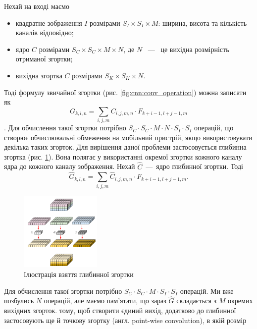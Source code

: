 Нехай на вході маємо
\begin{itemize}
    \item квадратне зображення $I$ розмірами $S_I \times S_I \times M$: ширина, висота та
          кількість каналів відповідно;
    \item ядро $C$ розмірами $S_C \times S_C \times M \times N$, де $N$ ~---~ це вихідна розмірність
          отриманої згортки;
    \item вихідна згортка $C$ розмірами $S_K \times S_K \times N$.
\end{itemize}
Тоді формулу звичайної згортки (рис. \ref{fig:cnn:conv_operation}) можна записати як
\begin{equation*}
    G_{k,l,n} = \sum_{i,j,m} C_{i,j,m,n} \cdot  F_{k+i-1, l+j-1,m}
\end{equation*}.
Для обчислення такої згортки потрібно $S_C \cdot  S_C \cdot  M \cdot  N \cdot  S_I \cdot  S_I$ операцій, що
створює обчислювальні обмеження на мобільний пристрій, якщо використовувати
декілька таких згорток.
Для вирішення даної проблеми застосовується глибинна згортка (рис. \ref{fig:cnn:deep_wise_conv}).
Вона полягає у використанні окремої згортки кожного каналу ядра до кожного каналу
зображення.
Нехай $\widehat{C}$~---~ядро глибинної згортки. Тоді
\begin{equation}
    \widehat{G}_{k,l,n} = \sum_{i,j,m} \widehat{C}_{i,j,m,n} \cdot  F_{k+i-1, l+j-1,m}.
\end{equation}
\begin{figure}[H]
    \centering
    \includegraphics[width=0.35\textwidth]{images/cnn_deep_wise_conv}
    \caption{Ілюстрація взяття глибинної згортки  \cite{deep_wise_sep_conv_website}
        \label{fig:cnn:deep_wise_conv}
    }
\end{figure}
Для обчислення такої згортки потрібно  $S_C \cdot  S_C \cdot  M \cdot  S_I \cdot  S_I$ операцій. Ми вже
позбулись $N$ операцій, але маємо пам'ятати, що
зараз $\widehat{G}$ складається з $M$ окремих вихідних згорток.
тому, щоб створити єдиний вихід, додатково до глибинної застосовують ще
й точкову згортку (англ. point-wise convolution), в якій розмір
